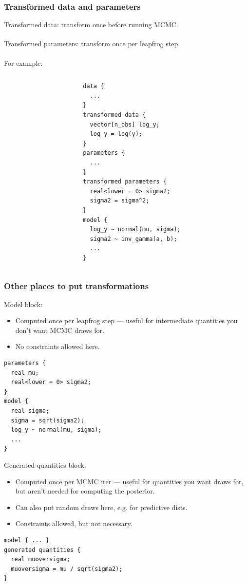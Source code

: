 \documentclass[xcolor=dvipsnames]{beamer}
\begin{document}
\begin{frame}[fragile]
\frametitle{Transformed data and parameters}
Transformed data: transform once before running MCMC.\\~\\

Transformed parameters: transform once per leapfrog step.\\~\\

For example:
\begin{columns}
\begin{column}{0.3\textwidth}
\end{column}
\begin{column}{0.7\textwidth}
{\tiny
\begin{verbatim}
data {
  ...
}
transformed data {
  vector[n_obs] log_y;
  log_y = log(y);
}
parameters {
  ...
}
transformed parameters {
  real<lower = 0> sigma2;
  sigma2 = sigma^2;
}
model {
  log_y ~ normal(mu, sigma);
  sigma2 ~ inv_gamma(a, b);
  ...
}
\end{verbatim}
}
\end{column}
\end{columns}
\end{frame}

\begin{frame}[fragile]
\frametitle{Other places to put transformations}
Model block:
\begin{itemize}
\item Computed once per leapfrog step --- useful for intermediate quantities you don't want MCMC draws for.
\item No constraints allowed here.
\end{itemize}
{\tiny
\begin{verbatim}
parameters {
  real mu;
  real<lower = 0> sigma2;
}
model {
  real sigma;
  sigma = sqrt(sigma2);
  log_y ~ normal(mu, sigma);
  ...
}
\end{verbatim}
}
Generated quantities block:
\begin{itemize}
\item Computed once per MCMC iter --- useful for quantities you want draws for, but aren't needed for computing the posterior.
\item Can also put random draws here, e.g. for predictive dists.
\item Constraints allowed, but not necessary.
\end{itemize}
{\tiny
\begin{verbatim}
model { ... }
generated quantities {
  real muoversigma;
  muoversigma = mu / sqrt(sigma2);
}
\end{verbatim}
}
\end{frame}
\end{document}
